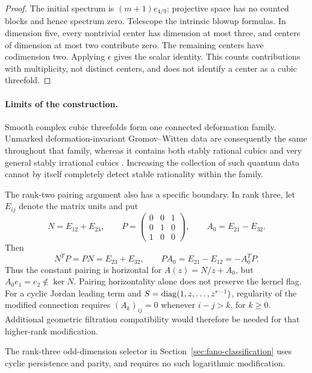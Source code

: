 \begin{proof}
The initial spectrum is \((m+1)e_{4/9}\); projective space has no counted
blocks and hence spectrum zero.  Telescope the intrinsic blowup formulas.
In dimension five, every nontrivial center has dimension at most three,
and centers of dimension at most two contribute zero.  The remaining
centers have codimension two.  Applying \(\epsilon\) gives the scalar
identity.  This counts contributions with multiplicity, not distinct
centers, and does not identify a center as a cubic threefold.
%
%
\end{proof}

\paragraph{Limits of the construction.}
Smooth complex cubic threefolds form one connected deformation family.
Unmarked deformation-invariant Gromov--Witten data are consequently the
same throughout that family, whereas it contains both stably rational
cubics \cite{TschinkelZhangTorsors} and very general stably irrational
cubics \cite{EGFS}.  Increasing the collection of such quantum data
cannot by itself completely detect stable rationality within the family.

The rank-two pairing argument also has a specific boundary.  In rank
three, let \(E_{ij}\) denote the matrix units and put
\[
 N=E_{12}+E_{23},\qquad
 P=\begin{pmatrix}0&0&1\\0&1&0\\1&0&0\end{pmatrix},\qquad
 A_0=E_{21}-E_{32}.
\]
Then
\[
 N^TP=PN=E_{23}+E_{32},\qquad
 PA_0=E_{21}-E_{12}=-A_0^TP.
\]
Thus the constant pairing is horizontal for \(A(z)=N/z+A_0\), but
\(A_0e_1=e_2\notin\ker N\).  Pairing horizontality alone does not
preserve the kernel flag.  For a cyclic Jordan leading term and
\(S=\operatorname{diag}(1,z,\ldots,z^{r-1})\), regularity of the modified connection
requires \((A_k)_{ij}=0\) whenever \(i-j>k\), for \(k\geq0\).
Additional geometric filtration compatibility would therefore be needed
for that higher-rank modification.

The rank-three odd-dimension selector in Section~\ref{sec:fano-classification}
uses cyclic persistence and parity, and requires no such logarithmic modification.
